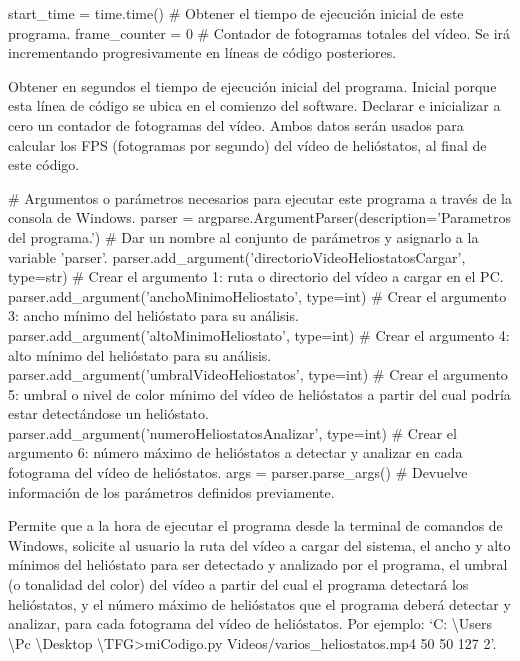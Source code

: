 \documentclass[12pt]{article}
\begin{document}
start\_time = time.time() \# Obtener el tiempo de ejecución inicial de este programa.
frame\_counter = 0 \# Contador de fotogramas totales del vídeo. Se irá incrementando progresivamente en líneas de código posteriores.

Obtener en segundos el tiempo de ejecución inicial del programa. Inicial porque esta línea de código se ubica en el comienzo del software. Declarar e inicializar a cero un contador de fotogramas del vídeo. Ambos datos serán usados para calcular los FPS (fotogramas por segundo) del vídeo de helióstatos, al final de este código.


\# Argumentos o parámetros necesarios para ejecutar este programa a través de la consola de Windows.
parser = argparse.ArgumentParser(description='Parametros del programa.') \# Dar un nombre al conjunto de parámetros y asignarlo a la variable 'parser'.
parser.add\_argument('directorioVideoHeliostatosCargar', type=str) \# Crear el argumento 1: ruta o directorio del vídeo a cargar en el PC.
parser.add\_argument('anchoMinimoHeliostato', type=int) \# Crear el argumento 3: ancho mínimo del helióstato para su análisis.
parser.add\_argument('altoMinimoHeliostato', type=int) \# Crear el argumento 4: alto mínimo del helióstato para su análisis.
parser.add\_argument('umbralVideoHeliostatos', type=int) \# Crear el argumento 5: umbral o nivel de color mínimo del vídeo de helióstatos a partir del cual podría estar detectándose un helióstato.
parser.add\_argument('numeroHeliostatosAnalizar', type=int) \# Crear el argumento 6: número máximo de helióstatos a detectar y analizar en cada fotograma del vídeo de helióstatos.
args = parser.parse\_args() \# Devuelve información de los parámetros definidos previamente.

Permite que a la hora de ejecutar el programa desde la terminal de comandos de Windows, solicite al usuario la ruta del vídeo a cargar del sistema, el ancho y alto mínimos del helióstato para ser detectado y analizado por el programa, el umbral (o tonalidad del color) del vídeo a partir del cual el programa detectará los helióstatos, y el número máximo de helióstatos que el programa deberá detectar y analizar, para cada fotograma del vídeo de helióstatos. Por ejemplo: ‘C: \textbackslash Users \textbackslash Pc \textbackslash Desktop \textbackslash TFG>miCodigo.py Videos/varios\_heliostatos.mp4 50 50 127 2’.
\end{document}
